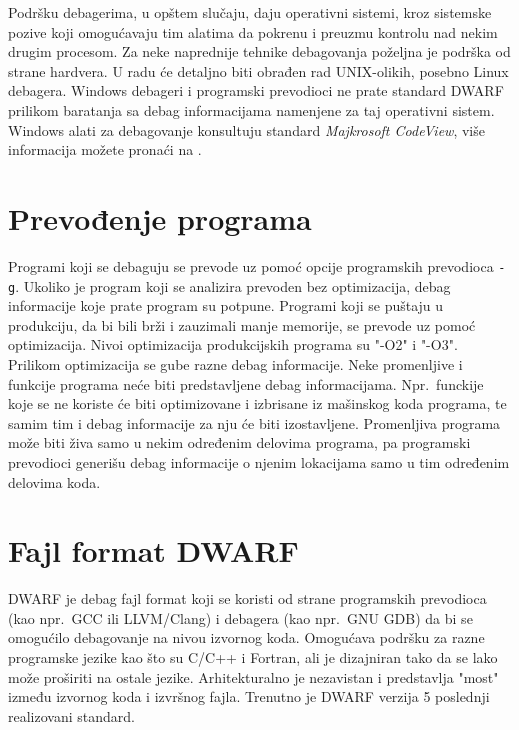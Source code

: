 \documentclass[12pt,oneside]{memoir}
\begin{document}
Podršku debagerima, u opštem slučaju, daju operativni sistemi, kroz sistemske pozive koji omogućavaju tim alatima da pokrenu i preuzmu kontrolu nad nekim drugim procesom. Za neke naprednije tehnike debagovanja poželjna je podrška od strane hardvera. U radu će detaljno biti obrađen rad UNIX-olikih, posebno Linux debagera. Windows debageri i programski prevodioci ne prate standard DWARF \cite{DWARF} prilikom baratanja sa debag informacijama namenjene za taj operativni sistem. Windows alati za debagovanje konsultuju standard \emph{Majkrosoft CodeView}, više informacija možete pronaći na \cite{CodeView}.

\section{Prevođenje programa}

Programi koji se debaguju se prevode uz pomoć opcije programskih prevodioca \texttt{-g}. Ukoliko je program koji se analizira prevoden bez optimizacija, debag informacije koje prate program su potpune. Programi koji se puštaju u produkciju, da bi bili brži i zauzimali manje memorije, se prevode uz pomoć optimizacija. Nivoi optimizacija produkcijskih programa su "-O2" i "-O3". Prilikom optimizacija se gube razne debag informacije. Neke promenljive i funkcije programa neće biti predstavljene debag informacijama. Npr.~funckije koje se ne koriste će biti optimizovane i izbrisane iz mašinskog koda programa, te samim tim i debag informacije za nju će biti izostavljene. Promenljiva programa može biti živa samo u nekim određenim delovima programa, pa programski prevodioci generišu debag informacije o njenim lokacijama samo u tim određenim delovima koda.

\section{Fajl format DWARF}

DWARF je debag fajl format koji se koristi od strane programskih prevodioca (kao npr.~GCC ili LLVM/Clang) i debagera (kao npr.~GNU GDB) da bi se omogućilo debagovanje na nivou izvornog koda. Omogućava podršku za razne programske jezike kao što su C/C++ i Fortran, ali je dizajniran tako da se lako može proširiti na ostale jezike. Arhitekturalno je nezavistan i predstavlja "most" između izvornog koda i izvršnog fajla. Trenutno je DWARF verzija 5 poslednji realizovani standard.
\end{document}

